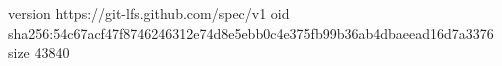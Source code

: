 version https://git-lfs.github.com/spec/v1
oid sha256:54c67acf47f8746246312e74d8e5ebb0c4e375fb99b36ab4dbaeead16d7a3376
size 43840
